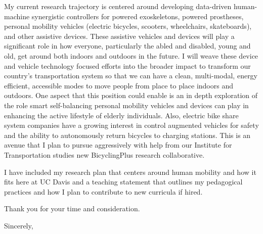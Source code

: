 \documentclass{letter}
\begin{document}
\begin{letter}
My current research trajectory is centered around developing data-driven
human-machine synergistic controllers for powered exoskeletons, powered
prostheses, personal mobility vehicles (electric bicycles, scooters,
wheelchairs, skateboards), and other assistive devices. These assistive
vehicles and devices will play a significant role in how everyone, particularly
the abled and disabled, young and old, get around both indoors and outdoors in
the future. I will weave these device and vehicle technology focused efforts
into the broader impact to transform our country's transportation system so
that we can have a clean, multi-modal, energy efficient, accessible modes to
move people from place to place indoors and outdoors. One aspect that this
position could enable is an in depth exploration of the role smart
self-balancing personal mobility vehicles and devices can play in enhancing the
active lifestyle of elderly individuals. Also, electric bike share system
companies have a growing interest in control augmented vehicles for safety and
the ability to autonomously return bicycles to charging stations. This is an
avenue that I plan to pursue aggressively with help from our Institute for
Transportation studies new BicyclingPlus research collaborative.

I have included my research plan that centers around human mobility and how it
fits here at UC Davis and a teaching statement that outlines my pedagogical
practices and how I plan to contribute to new curricula if hired.

Thank you for your time and consideration.

\closing{Sincerely,}

\end{letter}
\end{document}
